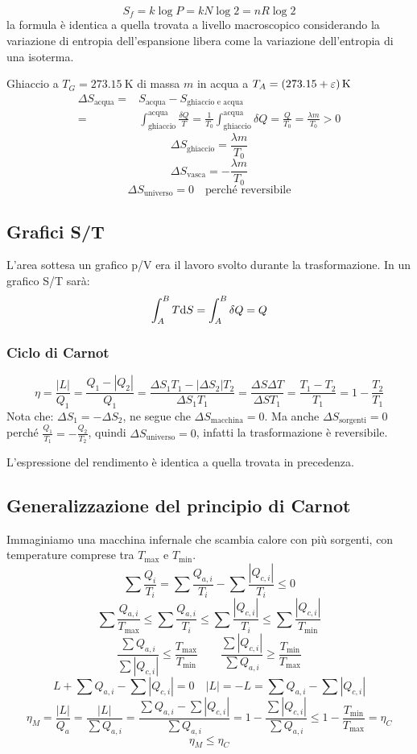 \[S_f=k\log P=kN\log 2=nR\log 2\]
la formula è identica a quella trovata a livello macroscopico considerando la variazione di entropia dell'espansione libera come la variazione dell'entropia di una isoterma.

\begin{Es}
   Ghiaccio a $T_G=\SI{273.15}{\kelvin}$ di massa $m$ in acqua a $T_A=\SI[parse-numbers = false]{(273.15+\varepsilon)}{\kelvin}$
   \begin{align*}
      \Delta S_\text{acqua}= & S_\text{acqua}-S_\text{ghiaccio e acqua}                                                                                                         \\
      =                      & \int_\text{ghiaccio}^\text{acqua}\frac{\delta Q}{T}=\frac{1}{T_0}\int_\text{ghiaccio}^\text{acqua}\delta Q=\frac{Q}{T_0}=\frac{\lambda m}{T_0}>0
   \end{align*}
   \[\Delta S_\text{ghiaccio}=\frac{\lambda m}{T_0}\]
   \[\Delta S_\text{vasca}=-\frac{\lambda m}{T_0}\]
   \[\Delta S_\text{universo}=0\quad\text{perché reversibile}\]
\end{Es}
\subsection{Grafici S/T}
L'area sottesa un grafico p/V era il lavoro svolto durante la trasformazione. In un grafico S/T sarà:
\[\int_A^B T\mathrm{d} S=\int_A^B\delta Q=Q\]
\subsubsection{Ciclo di Carnot}
\[\eta=\frac{|L|}{Q_1}=\frac{Q_1-|Q_2|}{Q_1}=\frac{\Delta S_1T_1-|\Delta S_2| T_2}{\Delta S_1 T_1}=\frac{\Delta S\Delta T}{\Delta S T_1}=\frac{T_1-T_2}{T_1}=1-\frac{T_2}{T_1}\]
Nota che: $\Delta S_1=-\Delta S_2$, ne segue che $\Delta S_\text{macchina}=0$. Ma anche \mbox{$\Delta S_\text{sorgenti}=0$} perché $\frac{Q_1}{T_1}=-\frac{Q_2}{T_2}$, quindi $\Delta S_\text{universo}=0$, infatti la trasformazione è reversibile.

L'espressione del rendimento è identica a quella trovata in precedenza.
\subsection{Generalizzazione del principio di Carnot}
Immaginiamo una macchina infernale che scambia calore con più sorgenti, con temperature comprese tra $T_{\max}$ e $T_{\min}$.
\[\sum\frac{Q_i}{T_i}=\sum\frac{Q_{a,i}}{T_i}-\sum\frac{|Q_{c,i}|}{T_i}\leq 0\]
\[\sum\frac{Q_{a,i}}{T_{\max}} \leq \sum\frac{Q_{a,i}}{T_i}\leq\sum\frac{|Q_{c,i}|}{T_i}\leq\sum\frac{|Q_{c,i}|}{T_{\min}}\]
\[\frac{\sum Q_{a,i}}{\sum|Q_{c,i}|}\leq\frac{T_{\max}}{T_{\min}}\qquad \frac{\sum |Q_{c,i}|}{\sum Q_{a,i}}\geq\frac{T_{\min}}{T_{\max}}\]
\[L+\sum Q_{a,i}-\sum|Q_{c,i}|=0\quad |L|=-L=\sum Q_{a,i}-\sum|Q_{c,i}|\]
\[\eta_M=\frac{|L|}{Q_a}=\frac{|L|}{\sum Q_{a,i}}=\frac{\sum Q_{a,i}-\sum |Q_{c,i}|}{\sum Q_{a,i}}=1-\frac{\sum|Q_{c,i}|}{\sum Q_{a,i}}\leq 1-\frac{T_{\min}}{T_{\max}}=\eta_C\]
\[\eta_M\leq\eta_C\]


